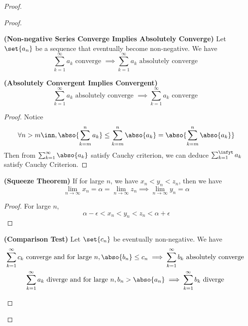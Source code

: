\documentclass{report}
\begin{document}
\begin{proof}
\begin{proof}
\begin{theorem}
\label{4.3.4}
\textbf{(Non-negative Series Converge Implies Absolutely Converge)} Let $\set{a_n}$ be a sequence that eventually become non-negative. We have
\begin{equation*}
\sum_{k=1}^\infty a_k\text{ converge }\implies \sum_{k=1}^\infty a_k\text{ absolutely converge }
\end{equation*}
\end{theorem}
\begin{theorem}
\label{4.3.5}
\textbf{(Absolutely Convergent Implies Convergent)} 
\begin{equation*}
\sum_{k=1}^\infty a_k\text{ absolutely converge }\implies \sum_{k=1}^\infty a_k\text{ converge }
\end{equation*}
\end{theorem}
\begin{proof}
Notice 
\begin{equation*}
\forall n>m \inn, \abso{\sum_{k=m}^n a_k}\leq \sum_{k=m}^n \abso{a_k}=\abso{\sum_{k=m}^n \abso{a_k}}
\end{equation*}
Then from $\sum_{k=1}^\infty \abso{a_k}$ satisfy Cauchy criterion, we can deduce $\sum_{k=1}^\infyt a_k$ satisfy Cauchy Criterion. 
\end{proof}
\begin{theorem}
\label{4.3.6}
\textbf{(Squeeze Theorem)} If for large $n$, we have  $x_n<y_n<z_n$, then we have
 \begin{equation*}
\lim_{n\to\infty}x_n=\alpha =\lim_{n\to\infty}z_n\implies \lim_{n\to\infty}y_n=\alpha 
\end{equation*}
\end{theorem}
\begin{proof}
For large $n$, 
 \begin{equation*}
\alpha -\epsilon <x_n<y_n<z_n<\alpha +\epsilon 
\end{equation*}
\end{proof}
\begin{theorem}
\label{4.3.7}
\textbf{(Comparison Test)} Let $\set{c_n}$ be eventually non-negative. We have
\begin{gather*}
  \sum_{k=1}^\infty c_k\text{ converge and for large }n, \abso{b_n}\leq c_n\implies \sum_{k=1}^\infty b_k\text{ absolutely converge }\\
  \sum_{k=1}^\infty a_k\text{ diverge and for large $n$}, b_n>\abso{a_n}\implies \sum_{k=1}^\infty b_k\text{ diverge }

\end{gather*}
\end{theorem}
\end{proof}
\end{proof}
\end{document}
